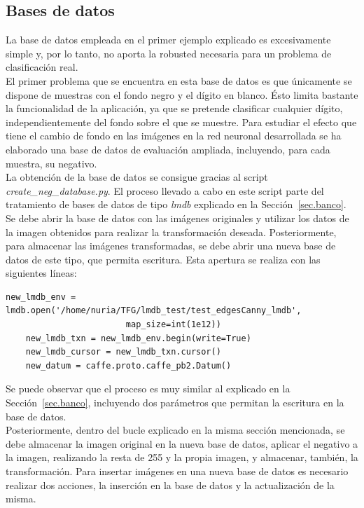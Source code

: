 \subsection{Bases de datos}

La base de datos empleada en el primer ejemplo explicado es excesivamente simple y, por lo tanto, no aporta la robusted necesaria para un problema de clasificación real.\\

El primer problema que se encuentra en esta base de datos es que únicamente se dispone de muestras con el fondo negro y el dígito en blanco. Ésto limita bastante la funcionalidad de la aplicación, ya que se pretende clasificar cualquier dígito, independientemente del fondo sobre el que se muestre. Para estudiar el efecto que tiene el cambio de fondo en las imágenes en la red neuronal desarrollada se ha elaborado una base de datos de evaluación ampliada, incluyendo, para cada muestra, su negativo.\\

La obtención de la base de datos se consigue gracias al script \textit{create\_neg\_database.py}. El proceso llevado a cabo en este script parte del tratamiento de bases de datos de tipo \textit{lmdb} explicado en la Sección~\ref{sec.banco}. Se debe abrir la base de datos con las imágenes originales y utilizar los datos de la imagen obtenidos para realizar la transformación deseada. Posteriormente, para almacenar las imágenes transformadas, se debe abrir una nueva base de datos de este tipo, que permita escritura. Esta apertura se realiza con las siguientes líneas:
\vspace{35pt}
\begin{lstlisting}[frame=single]
	new_lmdb_env = lmdb.open('/home/nuria/TFG/lmdb_test/test_edgesCanny_lmdb',
						map_size=int(1e12))
	new_lmdb_txn = new_lmdb_env.begin(write=True)
	new_lmdb_cursor = new_lmdb_txn.cursor()
	new_datum = caffe.proto.caffe_pb2.Datum()
\end{lstlisting}
Se puede observar que el proceso es muy similar al explicado en la Sección~\ref{sec.banco}, incluyendo dos parámetros que permitan la escritura en la base de datos.\\

Posteriormente, dentro del bucle explicado en la misma sección mencionada, se debe almacenar la imagen original en la nueva base de datos, aplicar el negativo a la imagen, realizando la resta de 255 y la propia imagen, y almacenar, también, la transformación. Para insertar imágenes en una nueva base de datos es necesario realizar dos acciones, la inserción en la base de datos y la actualización de la misma.\\

